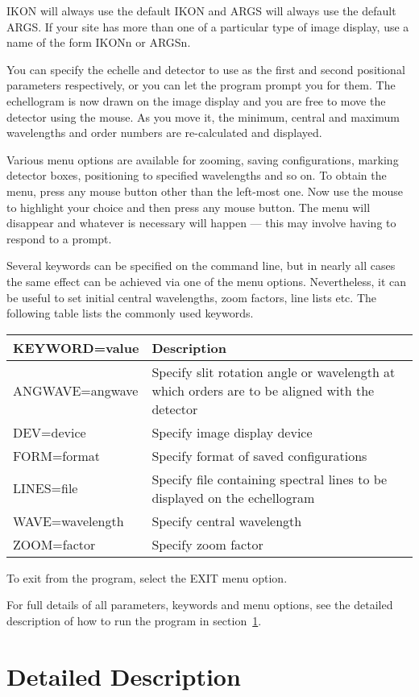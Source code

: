 IKON will always use the default IKON and ARGS will always use the default
ARGS. If your site has more than one of a particular type of image display, use
a name of the form IKONn or ARGSn.

You can specify the echelle and detector to use as the first and second
positional parameters respectively, or you can let the program prompt you for
them. The echellogram is now drawn on the image display and you are free to
move the detector using the mouse. As you move it, the minimum, central and
maximum wavelengths and order numbers are re-calculated and displayed.

Various menu options are available for zooming, saving configurations, marking
detector boxes, positioning to specified wavelengths and so on. To obtain the
menu, press any mouse button other than the left-most one. Now use the mouse to
highlight your choice and then press any mouse button. The menu will disappear
and whatever is necessary will happen --- this may involve having to respond to
a prompt.

Several keywords can be specified on the command line, but in nearly all cases
the same effect can be achieved via one of the menu options. Nevertheless, it
can be useful to set initial central wavelengths, zoom factors, line lists etc.
The following table lists the commonly used keywords.

\begin{tabular}{lp{115mm}}
KEYWORD=value	& Description \\ \hline
ANGWAVE=angwave	& Specify slit rotation angle or wavelength at which orders are
		to be aligned with the detector \\
DEV=device	& Specify image display device \\
FORM=format	& Specify format of saved configurations \\
LINES=file	& Specify file containing spectral lines to be displayed on the 
		echellogram \\
WAVE=wavelength	& Specify central wavelength \\
ZOOM=factor	& Specify zoom factor
\end{tabular}

To exit from the program, select the EXIT menu option.

For full details of all parameters, keywords and menu options, see the detailed
description of how to run the program in section~\ref{Detailed Description}.

\section{Detailed Description}
\label{Detailed Description}


